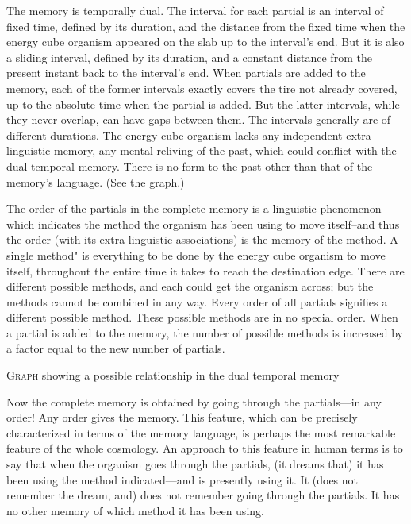 \documentclass[10pt,twoside]{memoir}
\begin{document}
\begin{enumerate}
{\begin{enumerate}
\begin{sysrules}
\begin{sysrules}
\begin{sysrules}
\begin{sysrules}
{\begin{enumerate}
The memory is temporally dual. The interval for each partial is an 
interval of fixed time, defined by its duration, and the distance from the 
fixed time when the energy cube organism appeared on the slab up to the 
interval's end. But it is also a sliding interval, defined by its duration, and a 
constant distance from the present instant back to the interval's end. When 
partials are added to the memory, each of the former intervals exactly covers 
the tire not already covered, up to the absolute time when the partial is 
added. But the latter intervals, while they never overlap, can have gaps 
between them. The intervals generally are of different durations. The energy 
cube organism lacks any independent extra-linguistic memory, any mental 
reliving of the past, which could conflict with the dual temporal memory. 
There is no form to the past other than that of the memory's language. (See 
the graph.) 

The order of the partials in the complete memory is a linguistic 
phenomenon which indicates the method the organism has been using to 
move itself--and thus the order (with its extra-linguistic associations) is the 
memory of the method. A single method" is everything to be done by the 
energy cube organism to move itself, throughout the entire time it takes to 
reach the destination edge. There are different possible methods, and each 
could get the organism across; but the methods cannot be combined in any 
way. Every order of all partials signifies a different possible method. These 
possible methods are in no special order. When a partial is added to the 
memory, the number of possible methods is increased by a factor equal to 
the new number of partials. 


{
	\centering
	\textsc{Graph} showing a possible relationship in the dual temporal memory 
	\par
}


Now the complete memory is obtained by going through the partials---in 
any order! Any order gives the memory. This feature, which can be 
precisely characterized in terms of the memory language, is perhaps the most 
remarkable feature of the whole cosmology. An approach to this feature in 
human terms is to say that when the organism goes through the partials, (it 
dreams that) it has been using the method indicated---and is presently using 
it. It (does not remember the dream, and) does not remember going through 
the partials. It has no other memory of which method it has been using. 


\end{enumerate}}
\end{sysrules}
\end{sysrules}
\end{sysrules}
\end{sysrules}
\end{enumerate}}
\end{enumerate}
\end{document}
